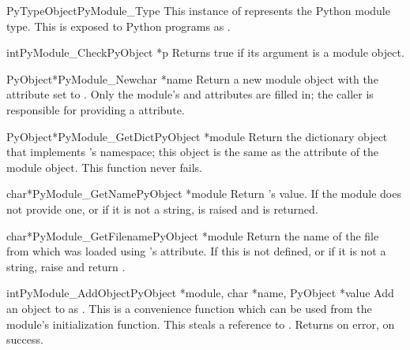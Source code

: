 \documentclass{manual}
\begin{document}
\begin{cvardesc}{PyTypeObject}{PyModule_Type}
This instance of  represents the Python module
type.  This is exposed to Python programs as .
\end{cvardesc}

\begin{cfuncdesc}{int}{PyModule_Check}{PyObject *p}
Returns true if its argument is a module object.
\end{cfuncdesc}

\begin{cfuncdesc}{PyObject*}{PyModule_New}{char *name}
Return a new module object with the  attribute set to
.  Only the module's  and
 attributes are filled in; the caller is responsible
for providing a  attribute.
\end{cfuncdesc}

\begin{cfuncdesc}{PyObject*}{PyModule_GetDict}{PyObject *module}
Return the dictionary object that implements 's namespace; 
this object is the same as the  attribute of the
module object.  This function never fails.
\end{cfuncdesc}

\begin{cfuncdesc}{char*}{PyModule_GetName}{PyObject *module}
Return 's  value.  If the module does not 
provide one, or if it is not a string,  is
raised and \NULL{} is returned.
\end{cfuncdesc}

\begin{cfuncdesc}{char*}{PyModule_GetFilename}{PyObject *module}
Return the name of the file from which  was loaded using
's  attribute.  If this is not defined,
or if it is not a string, raise  and return
\NULL.
\end{cfuncdesc}

\begin{cfuncdesc}{int}{PyModule_AddObject}{PyObject *module,
                                           char *name, PyObject *value}
Add an object to  as .  This is a convenience
function which can be used from the module's initialization function.
This steals a reference to .  Returns  on error,
 on success.
\end{cfuncdesc}
\end{document}
